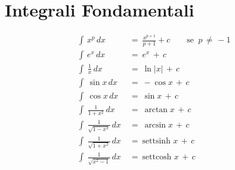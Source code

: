 \documentclass[12pt, twoside, italian]{book}
\begin{document}
 	\section*{Integrali Fondamentali}
 	\[
 	\begin{aligned}
 		\int\, x^p \, dx\ &=\ \frac{x^{p+1}}{p+1} + c \qquad \text{se }\ p\, \neq\, -1 \\
 		\int\, e^x \, dx\ &=\ e^x\, +\, c \\
 		\int\ \frac{1}{x} \, dx\ &=\ \ln |x|\, +\, c \\
 		\int\ \sin x \, dx \ &=\ -\cos x\, +\, c \\
 		\int\ \cos x \, dx\ &=\ \sin x\, +\, c \\
 		\int\ \frac{1}{1 + x^2} \, dx\ &=\ \arctan x\, +\, c \\
 		\int\ \frac{1}{\sqrt{1 - x^2}} \, dx\ &=\ \arcsin x\, +\, c \\
 		\int\ \frac{1}{\sqrt{1 + x^2}} \, dx\ &=\ \text{settsinh } x\, +\, c \\
 		\int\ \frac{1}{\sqrt{x^2 - 1}} \, dx\ &=\ \text{settcosh } x\, +\, c
 	\end{aligned}
 	\]
 	\newpage
	
	\newpage
	
	
	
	\newpage
	
	
	
	\newpage
	
	\newpage
	
	
	
	\newpage
	
	
	
	\newpage
	
	
	
	\newpage
	
	
	
	\newpage
	
	
\end{document}

